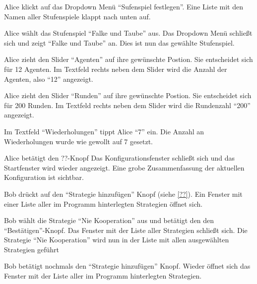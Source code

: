 \documentclass[parskip=full,11pt]{scrartcl}
\begin{document}
{Alice klickt auf das Dropdown Menü \enquote{Sufenspiel festlegen}.}%
{Eine Liste mit den Namen aller Stufenspiele klappt nach unten auf.}

{Alice wählt das Stufenspiel \enquote{Falke und Taube} aus.}
{Das Dropdown Menü schließt sich und zeigt \enquote{Falke und Taube} an. Dies ist nun das gewählte Stufenspiel.}

{Alice zieht den Slider \enquote{Agenten} auf ihre gewünschte Postion. Sie entscheidet sich für 12 Agenten.}%
{Im Textfeld rechts neben dem Slider wird die Anzahl der Agenten, also \enquote{12} angezeigt.}

{Alice zieht den Slider \enquote{Runden} auf ihre gewünschte Postion. Sie entscheidet sich für 200 Runden.}%
{Im Textfeld rechts neben dem Slider wird die Rundenzahl \enquote{200} angezeigt.}

{Im Textfeld \enquote{Wiederholungen} tippt Alice \enquote{7} ein.}%
{Die Anzahl an Wiederholungen wurde wie gewollt auf 7 gesetzt.}

{Alice betätigt den ??-Knopf}
{Das Konfigurationsfenster schließt sich und das Startfenster wird wieder angezeigt. Eine grobe Zusammenfassung der aktuellen Konfiguration ist sichtbar.}


%
{Bob drückt auf den \enquote{Strategie hinzufügen} Knopf (siehe \cref{??}).}
{Ein Fenster mit einer Liste aller im Programm hinterlegten Strategien öffnet sich.}

{Bob wählt die Strategie \enquote{Nie Kooperation} aus und betätigt den den \enquote{Bestätigen}-Knopf.}
{Das Fenster mit der Liste aller Strategien schließt sich. Die Strategie \enquote{Nie Kooperation} wird nun in der Liste mit allen ausgewählten Strategien geführt}

{Bob betätigt nochmals den  \enquote{Strategie hinzufügen} Knopf.}
{Wieder öffnet sich das Fenster mit der Liste aller im Programm hinterlegten Strategien.}
\end{document}
